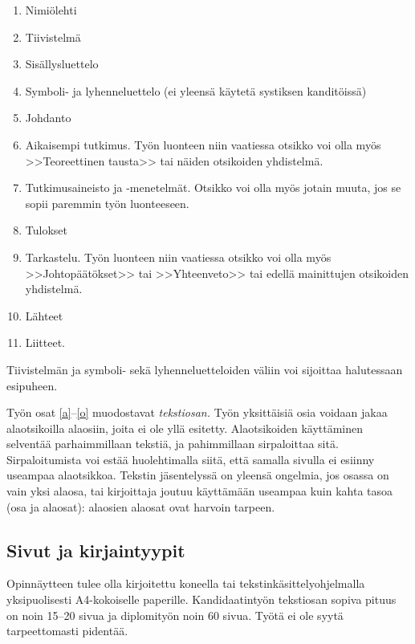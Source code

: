 \documentclass[english, 12pt, a4paper, sci, utf8, a-1b, online]{aaltothesis}
\begin{document}
\begin{enumerate}
\item Nimiölehti
\item Tiivistelmä
\item Sisällysluettelo
\item Symboli- ja lyhenneluettelo (ei yleensä käytetä systiksen kanditöissä)
\item \label{a} Johdanto
\item  Aikaisempi tutkimus. Työn luonteen niin vaatiessa otsikko voi olla myös
        >>Teoreettinen tausta>>  tai näiden otsikoiden yhdistelmä.
\item Tutkimusaineisto ja -menetelmät. Otsikko voi olla myös jotain muuta, jos se sopii paremmin työn luonteeseen. %
\item Tulokset
\item \label{o} Tarkastelu. Työn luonteen niin vaatiessa otsikko voi olla myös
		>>Johtopäätökset>> tai >>Yhteenveto>> tai edellä mainittujen otsikoiden
		yhdistelmä.
\item Lähteet
\item Liitteet.
\end{enumerate}

Tiivistelmän ja symboli- sekä lyhenneluetteloiden väliin voi sijoittaa
halutessaan esipuheen.  

Työn osat \ref{a}--\ref{o} muodostavat \textit{tekstiosan.}  Työn yksittäisiä
osia voidaan jakaa alaotsikoilla alaosiin, joita ei ole yllä esitetty. 
Alaotsikoiden käyttäminen selventää parhaimmillaan tekstiä, ja pahimmillaan 
sirpaloittaa sitä.  Sirpaloitumista voi estää huolehtimalla siitä, että samalla 
sivulla ei esiinny useampaa alaotsikkoa. Tekstin jäsentelyssä on yleensä 
ongelmia, jos osassa on vain yksi alaosa, tai kirjoittaja joutuu käyttämään 
useampaa kuin kahta tasoa (osa ja alaosat): alaosien alaosat ovat harvoin tarpeen.

\subsection{Sivut ja kirjaintyypit}

Opinnäytteen tulee olla kirjoitettu koneella tai
tekstinkäsittelyohjelmalla yksipuolisesti A4-kokoiselle paperille.
Kandidaatintyön tekstiosan sopiva pituus on noin 15--20 sivua ja
diplomityön noin 60 sivua. Työtä ei ole syytä tarpeettomasti pidentää.
\end{document}
